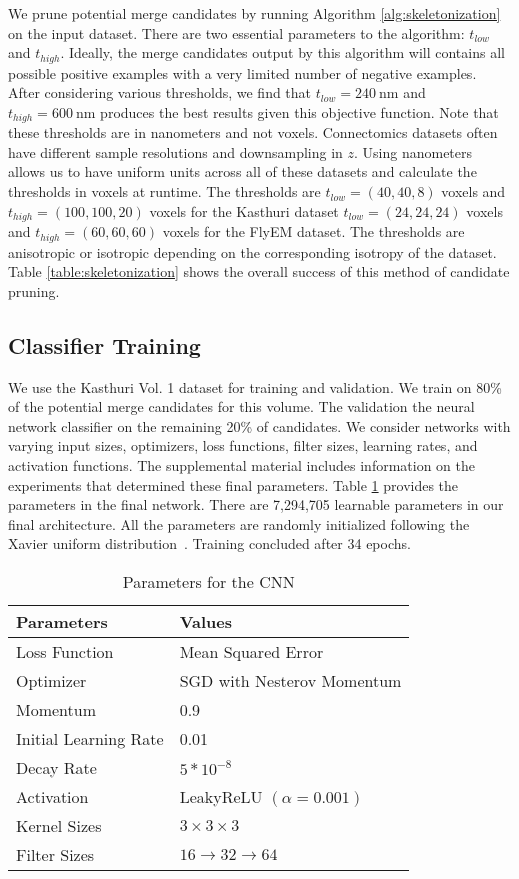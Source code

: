We prune potential merge candidates by running Algorithm \ref{alg:skeletonization} on the input dataset. 
There are two essential parameters to the algorithm: $t_{low}$ and $t_{high}$. 
Ideally, the merge candidates output by this algorithm will contains all possible positive examples with a very limited number of negative examples. 
After considering various thresholds, we find that $t_{low} = \SI{240}{\nano\meter}$ and $t_{high} = \SI{600}{\nano\meter}$ produces the best results given this objective function. 
Note that these thresholds are in nanometers and not voxels. 
Connectomics datasets often have different sample resolutions and downsampling in $z$. 
Using nanometers allows us to have uniform units across all of these datasets and calculate the thresholds in voxels at runtime. 
The thresholds are $t_{low} = (40, 40, 8)$ voxels and $t_{high} = (100, 100, 20)$ voxels for the Kasthuri dataset $t_{low} = (24, 24, 24)$ voxels and $t_{high} = (60, 60, 60)$ voxels for the FlyEM dataset.
The thresholds are anisotropic or isotropic depending on the corresponding isotropy of the dataset.
Table \ref{table:skeletonization} shows the overall success of this method of candidate pruning.

\subsection{Classifier Training}

We use the Kasthuri Vol. 1 dataset for training and validation. 
We train on 80\% of the potential merge candidates for this volume.
The validation the neural network classifier on the remaining 20\% of candidates. 
We consider networks with varying input sizes, optimizers, loss functions, filter sizes, learning rates, and activation functions. 
The supplemental material includes information on the experiments that determined these final parameters. 
Table \ref{table:architecture} provides the parameters in the final network.
There are 7,294,705 learnable parameters in our final architecture.
All the parameters are randomly initialized following the Xavier uniform distribution~\cite{glorot2010understanding}. 
Training concluded after 34 epochs. 

\begin{table}[h!]
	\centering
	\begin{tabular}{l l} \hline
		\textbf{Parameters} & \textbf{Values} \\ \hline
		Loss Function & Mean Squared Error \\
		Optimizer & SGD  with Nesterov Momentum \\
		Momentum & 0.9 \\
		Initial Learning Rate & 0.01 \\
		Decay Rate & $5 * 10^{-8}$ \\
		Activation & LeakyReLU $(\alpha = 0.001)$ \\
		Kernel Sizes & $3 \times 3 \times 3$ \\
		Filter Sizes & $16 \to 32 \to 64$ \\ \hline
	\end{tabular}
	\caption{Parameters for the CNN}
	\label{table:architecture}
\end{table}



